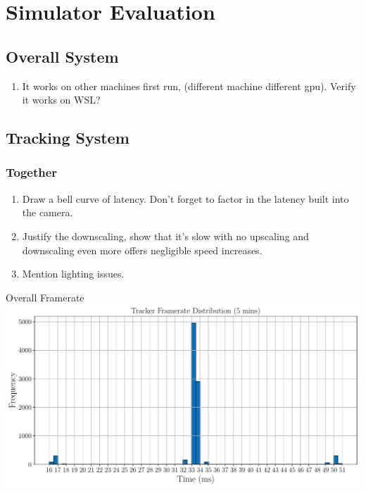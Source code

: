 \section{Simulator Evaluation}

\subsection{Overall System}
\begin{enumerate}
	\item It works on other machines first run, (different machine different gpu). Verify it works on WSL?
\end{enumerate}

\subsection{Tracking System}
\subsubsection{Together}
\begin{enumerate}
	\item Draw a bell curve of latency. Don't forget to factor in the latency built into the camera. 
	\item Justify the downscaling, show that it's slow with no upscaling and downscaling even more offers negligible speed increases.  
	\item Mention lighting issues.
\end{enumerate}

\begin{figureBox}[label={fig:framerate-overall}, width=1.0\linewidth]{Overall Framerate}
	\includegraphics[width = 1.0\linewidth]{./evaluation/figures/framerate-overall.pdf}
\end{figureBox}

